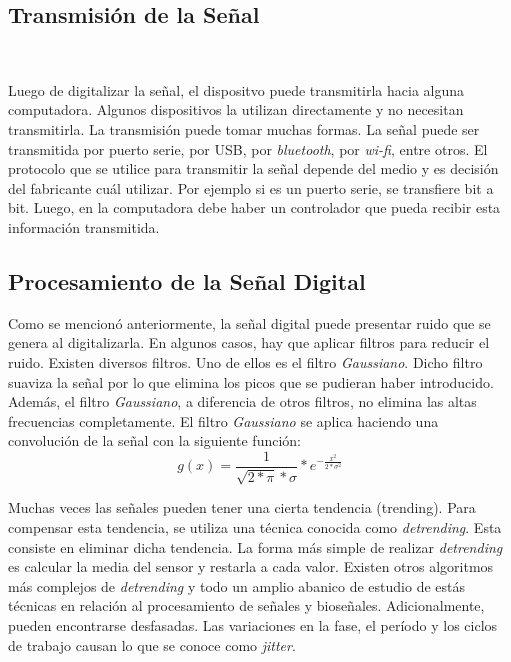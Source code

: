\subsection{Transmisión de la Señal}\

Luego de digitalizar la señal, el dispositvo puede transmitirla hacia alguna computadora. Algunos dispositivos la utilizan directamente y no necesitan transmitirla. La transmisión puede tomar muchas formas. La señal puede ser transmitida por puerto serie, por USB, por \emph{bluetooth}, por \emph{wi-fi}, entre otros. El protocolo que se utilice para transmitir la señal depende del medio y es decisión del fabricante cuál utilizar. Por ejemplo si es un puerto serie, se transfiere bit a  bit. Luego, en la computadora debe haber un controlador que pueda recibir esta información transmitida.

\subsection{Procesamiento de la Señal Digital}

Como se mencionó anteriormente, la señal digital puede presentar ruido que se genera al digitalizarla. En algunos casos, hay que aplicar filtros para reducir el ruido. Existen diversos filtros. Uno de ellos es el filtro \emph{Gaussiano}. Dicho filtro suaviza la señal por lo que elimina los picos que se pudieran haber introducido. Además, el filtro \emph{Gaussiano}, a diferencia de otros filtros, no elimina las altas frecuencias completamente. El filtro \emph{Gaussiano} se aplica haciendo una convolución de la señal con la siguiente función:
$$ g(x) = \frac{1}{\sqrt{2 * \pi} * \sigma } * e^{-\frac{x^{2}}{2 * \sigma^{2}}} $$

Muchas veces las señales pueden tener una cierta tendencia (trending). Para compensar esta tendencia, se utiliza una técnica conocida como \emph{detrending}. Esta consiste en eliminar dicha tendencia.  La forma más simple de realizar \emph{detrending} es calcular la media del sensor y restarla a cada valor. Existen otros algoritmos más complejos de \emph{detrending} y todo un amplio abanico de estudio de estás técnicas en relación al procesamiento de señales y bioseñales.  Adicionalmente, pueden encontrarse desfasadas. Las variaciones en la fase, el período y los ciclos de trabajo causan lo que se conoce como \emph{jitter}.

